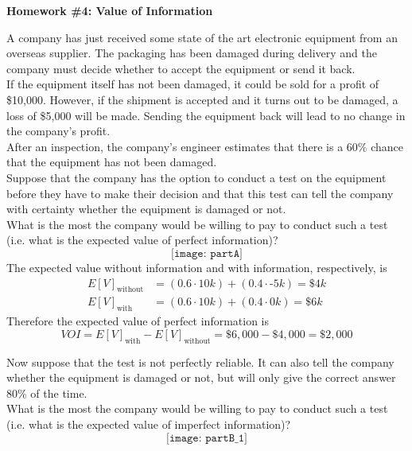 \documentclass[12pt]{article}
\begin{document}
\begin{center} \textbf{Homework \#4: Value of Information} \end{center}

A company has just received some state of the art electronic equipment from an overseas supplier. The packaging has been damaged during delivery and the company must decide whether to accept the equipment or send it back. \\

If the equipment itself has not been damaged, it could be sold for a profit of \$10,000. However, if the shipment is accepted and it turns out to be damaged, a loss of \$5,000 will be made. Sending the equipment back will lead to no change in the company's profit. \\

After an inspection, the company's engineer estimates that there is a 60\% chance that the equipment has not been damaged. \\

Suppose that the company has the option to conduct a test on the equipment before they have to make their decision and that this test can tell the company with certainty whether the equipment is damaged or not. \\

What is the most the company would be willing to pay to conduct such a test (i.e. what is the expected value of perfect information)? \\
$$ \texttt{[image: partA]} $$ 
The expected value without information and with information, respectively, is 
$$ \begin{aligned} E[V]_{\text{without}} &= (0.6 \cdot 10k) + (0.4 \cdot \text{-}5k) = \$4k \\
E[V]_{\text{with}} &= (0.6 \cdot 10k) + (0.4 \cdot 0k) = \$6k \end{aligned} $$ 
Therefore the expected value of perfect information is 
$$ VOI = E[V]_{\text{with}} - E[V]_{\text{without}} = \$6,000 - \$4,000 = \$2,000 $$ 

Now suppose that the test is not perfectly reliable. It can also tell the company whether the equipment is damaged or not, but will only give the correct answer 80\% of the time. \\

What is the most the company would be willing to pay to conduct such a test (i.e. what is the expected value of imperfect information)? \\
$$ \texttt{[image: partB\_1]} $$ 
\end{document}
